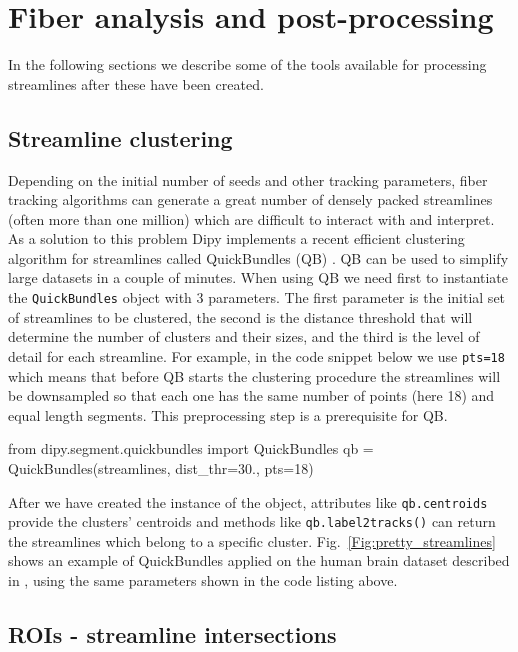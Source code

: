 \documentclass{bioinfo}
\begin{document}
\section{Fiber analysis and post-processing}\label{post_tracking}

In the following sections we describe some of the tools available for processing
streamlines after these have been created.
\subsection{Streamline clustering}\label{quickbundles}
Depending on the initial number of seeds and other tracking parameters,
fiber tracking algorithms can generate a great number of densely packed
streamlines (often more than one million) which are difficult to interact with
and interpret. As a solution to this problem Dipy implements a recent
efficient clustering algorithm for streamlines called QuickBundles (QB)
\citep{Garyfallidis_thesis,garyfallidis-etal:12}. QB can be used to
simplify large datasets in a couple of minutes.
When using QB we need first to instantiate the \texttt{QuickBundles} object with 3
parameters. The first parameter is the initial set of streamlines to be
clustered, the second is the distance threshold that will determine the number of clusters and their sizes,
and the third is the level of detail for each streamline. For example, in the
code snippet below we use \texttt{pts=18} which means that before QB
starts the clustering procedure the streamlines will be downsampled so that
each one has the same number of points (here 18) and equal length segments. This
preprocessing step is a prerequisite for QB.
\begin{python}
from dipy.segment.quickbundles import QuickBundles
qb = QuickBundles(streamlines, dist_thr=30.,
                  pts=18)
\end{python}
After we have created the instance of the object, attributes like
\texttt{qb.centroids} provide the clusters' centroids and methods like
\texttt{qb.label2tracks()} can return the streamlines which belong to a
specific cluster. Fig.~\ref{Fig:pretty_streamlines} shows an example of
QuickBundles applied on the human brain dataset described in \citep{Fortin2012},
using the same parameters shown in the code listing above.

\subsection{ROIs - streamline intersections}
\end{document}
